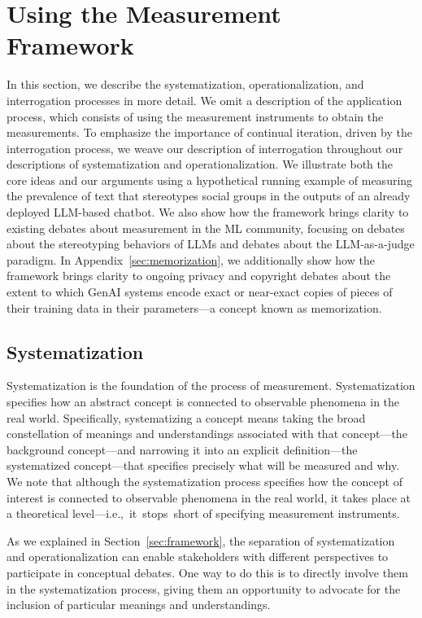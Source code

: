 \documentclass{article}
\begin{document}
\section{Using the Measurement Framework}
\label{sec:using_the_framework}

In this section, we describe the systematization, operationalization, and interrogation processes in more detail. We omit a description of the application process, which consists of using the measurement instruments to obtain the measurements. 
To emphasize the importance of continual iteration, driven by the interrogation process, we weave our description of interrogation throughout our descriptions of systematization and operationalization. We illustrate both the core ideas and our arguments using a hypothetical running example of measuring the prevalence of text that stereotypes social groups in the outputs of an already deployed LLM-based chatbot. We also show how the framework brings clarity to existing debates about measurement in the ML community, focusing on debates about 
the stereotyping behaviors of LLMs and debates about the LLM-as-a-judge paradigm. In Appendix~\ref{sec:memorization}, we additionally 
show how the framework brings clarity to ongoing privacy
and copyright debates about the extent to which GenAI systems encode
exact or near-exact copies of pieces of their training data in their parameters---a concept known as memorization.

\subsection{Systematization}
\label{sec:systematization}

Systematization is the foundation of the process of measurement. Systematization specifies how an abstract concept is connected to observable phenomena in the real world. Specifically, systematizing a concept means taking the broad constellation of meanings and understandings associated with that concept---the background concept---and narrowing it into an explicit definition---the systematized concept---that specifies  precisely what will be measured and why. We note that although the systematization process specifies how the concept of interest is connected to observable phenomena in the real world, it takes place at a theoretical level---i.e.,~it~stops~short of specifying measurement instruments.

As we explained in Section~\ref{sec:framework}, the separation of systematization and operationalization can enable stakeholders with different perspectives to participate in conceptual debates. One way to do this is to directly involve them in the systematization process, giving them an opportunity to advocate for the inclusion of particular meanings and understandings.
\end{document}
